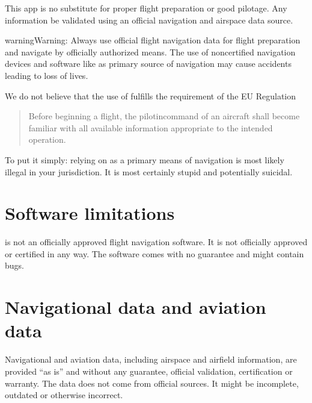 \documentclass[letterpaper,10pt,english]{sphinxmanual}
\begin{document}
\sphinxAtStartPar
This app is no substitute for proper flight preparation or good pilotage.  Any
information  be validated using an official navigation and
airspace data source.

\begin{sphinxadmonition}{warning}{Warning:}
\sphinxAtStartPar
Always use official flight navigation data for flight preparation
and navigate by officially authorized means. The use of non\sphinxhyphen{}certified
navigation devices and software like  as
primary source of navigation may cause accidents leading to loss of lives.
\end{sphinxadmonition}

\sphinxAtStartPar
We do not believe that the use of  fulfills the
requirement of the EU Regulation 
\begin{quote}

\sphinxAtStartPar
Before beginning a flight, the pilot\sphinxhyphen{}in\sphinxhyphen{}command of an aircraft shall become
familiar with all available information appropriate to the intended operation.
\end{quote}

\sphinxAtStartPar
To put it simply: relying on  as a primary means of
navigation is most likely illegal in your jurisdiction.  It is most certainly
stupid and potentially suicidal.


\section{Software limitations}
\label{\detokenize{01-intro/think:software-limitations}}
\sphinxAtStartPar
{} is not an officially approved flight navigation
software.  It is not officially approved or certified in any way.  The software
comes with no guarantee and might contain bugs.


\section{Navigational data and aviation data}
\label{\detokenize{01-intro/think:navigational-data-and-aviation-data}}
\sphinxAtStartPar
Navigational\textendash{} and aviation data, including airspace and airfield information,
are provided “as is” and without any guarantee, official validation,
certification or warranty.  The data does not come from official sources.  It
might be incomplete, outdated or otherwise incorrect.
\end{document}

